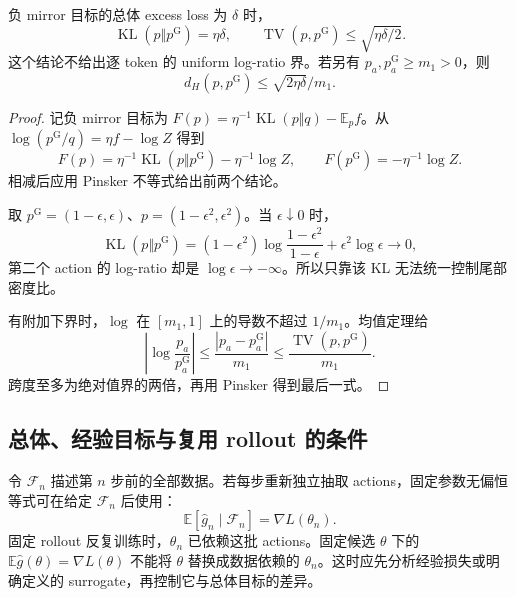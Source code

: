 \documentclass[lang=cn,scheme=chinese,openany]{../book/elegantbook}
\newcommand{\E}{\mathbb E}
\newcommand{\KL}{\operatorname{KL}}
\newcommand{\TV}{\operatorname{TV}}
\begin{document}
\begin{proposition}
\label{dyn:mdpo-gap}
负 mirror 目标的总体 excess loss 为 $\delta$ 时，
\begin{equation}
\KL(p\Vert p^{\mathrm G})=\eta\delta,\qquad
\TV(p,p^{\mathrm G})\le\sqrt{\eta\delta/2}.
\end{equation}
这个结论不给出逐 token 的 uniform log-ratio 界。若另有 $p_a,p^{\mathrm G}_a\ge m_1>0$，则
\begin{equation}
d_H(p,p^{\mathrm G})\le\sqrt{2\eta\delta}/m_1.
\end{equation}
\end{proposition}
\begin{proof}
记负 mirror 目标为 $F(p)=\eta^{-1}\KL(p\Vert q)-\E_pf$。从 $\log(p^{\mathrm G}/q)=\eta f-\log Z$ 得到
\begin{equation*}
F(p)=\eta^{-1}\KL(p\Vert p^{\mathrm G})-\eta^{-1}\log Z,
\qquad F(p^{\mathrm G})=-\eta^{-1}\log Z.
\end{equation*}
相减后应用 Pinsker 不等式给出前两个结论。

取 $p^{\mathrm G}=(1-\epsilon,\epsilon)$、$p=(1-\epsilon^2,\epsilon^2)$。当 $\epsilon\downarrow0$ 时，
\begin{equation*}
\KL(p\Vert p^{\mathrm G})
=(1-\epsilon^2)\log\frac{1-\epsilon^2}{1-\epsilon}
+\epsilon^2\log\epsilon\longrightarrow0,
\end{equation*}
第二个 action 的 log-ratio 却是 $\log\epsilon\to-\infty$。所以只靠该 KL 无法统一控制尾部密度比。

有附加下界时，$\log$ 在 $[m_1,1]$ 上的导数不超过 $1/m_1$。均值定理给
\begin{equation*}
\left|\log\frac{p_a}{p^{\mathrm G}_a}\right|
\le\frac{|p_a-p^{\mathrm G}_a|}{m_1}
\le\frac{\TV(p,p^{\mathrm G})}{m_1}.
\end{equation*}
跨度至多为绝对值界的两倍，再用 Pinsker 得到最后一式。
\end{proof}

\subsection{总体、经验目标与复用 rollout 的条件}
\label{dyn:replay}

令 $\mathcal F_n$ 描述第 $n$ 步前的全部数据。若每步重新独立抽取 actions，固定参数无偏恒等式可在给定 $\mathcal F_n$ 后使用：
\begin{equation}
\E[\widehat g_n\mid\mathcal F_n]=\nabla L(\theta_n).
\end{equation}
固定 rollout 反复训练时，$\theta_n$ 已依赖这批 actions。固定候选 $\theta$ 下的 $\E\widehat g(\theta)=\nabla L(\theta)$ 不能将 $\theta$ 替换成数据依赖的 $\theta_n$。这时应先分析经验损失或明确定义的 surrogate，再控制它与总体目标的差异。
\end{document}
